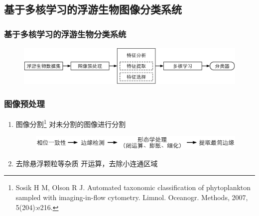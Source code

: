 \documentclass[notheorems,mathserif,table,compress]{beamer}  %
\begin{document}
\subsection{基于多核学习的浮游生物图像分类系统}

\begin{frame}
\frametitle{基于多核学习的浮游生物分类系统}

\begin{figure}
\includegraphics[width=1\linewidth]{frame}
\end{figure}
\end{frame}


\begin{frame}
\frametitle{图像预处理}
\begin{enumerate}
\item {\color{blue}图像分割}\footnote{Sosik H M, Olson R J. Automated taxonomic classification of phytoplankton sampled with imaging-in-flow cytometry. Limnol. Oceanogr. Methods, 2007, 5(204):e216.} 对未分割的图像进行分割

\begin{figure}
\includegraphics[width=0.9\linewidth]{imgpro}
\end{figure}


\item {\color{blue}去除悬浮颗粒等杂质} 开运算，去除小连通区域
\end{enumerate}
\end{frame}
\end{document}
